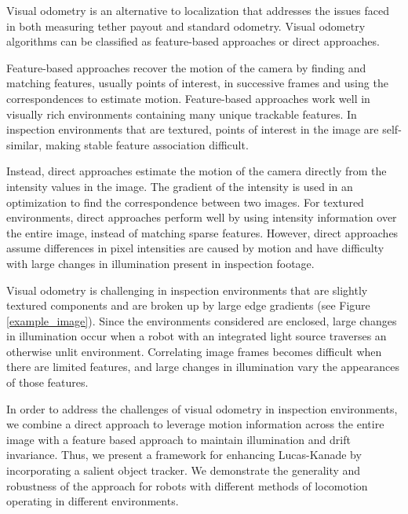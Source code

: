 \documentclass[letterpaper, 10 pt, conference]{ieeeconf}
\begin{document}

Visual odometry is an alternative to localization that addresses the issues faced in both measuring tether payout and standard odometry. Visual odometry algorithms can be classified as feature-based approaches or direct approaches. 

Feature-based approaches recover the motion of the camera by finding and matching features, usually points of interest, in successive frames and using the correspondences to estimate motion. Feature-based approaches work well in visually rich environments containing many unique trackable features. In inspection environments that are textured, points of interest in the image are self-similar, making stable feature association difficult. 

Instead, direct approaches estimate the motion of the camera directly from the intensity values in the image. The gradient of the intensity is used in an optimization to find the correspondence between two images. For textured environments, direct approaches perform well by using intensity information over the entire image, instead of matching sparse features. However, direct approaches assume differences in pixel intensities are caused by motion and have difficulty with large changes in illumination present in inspection footage.

Visual odometry is challenging in inspection environments that are slightly textured components and are broken up by large edge gradients (see Figure \ref{example_image}). Since the environments considered are enclosed, large changes in illumination occur when a robot with an integrated light source traverses an otherwise unlit environment. Correlating image frames becomes difficult when there are limited features, and large changes in illumination vary the appearances of those features. 

In order to address the challenges of visual odometry in inspection environments, we combine a direct approach to leverage motion information across the entire image with a feature based approach to maintain illumination and drift invariance. Thus, we present a framework for enhancing Lucas-Kanade by incorporating a salient object tracker. We demonstrate the generality and robustness of the approach for robots with different methods of locomotion operating in different environments.
\end{document}
